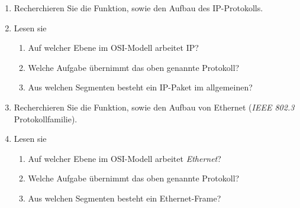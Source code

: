 \documentclass[paper=a4,fontsize=11pt]{scrartcl}%
\numberwithin{equation}{section}
\begin{document}
\begin{enumerate}
	\item Recherchieren Sie die Funktion, sowie den Aufbau des IP-Protokolls.
	\item Lesen sie \cite[Kap. 4.1]{Kurose2012}
	\begin{enumerate}
		\item Auf welcher Ebene im OSI-Modell arbeitet IP?
		\item Welche Aufgabe übernimmt das oben genannte Protokoll?
		\item Aus welchen Segmenten besteht ein IP-Paket im allgemeinen?
	\end{enumerate}
	\item Recherchieren Sie die Funktion, sowie den Aufbau von Ethernet (\emph{IEEE 802.3} Protokollfamilie).
	\item Lesen sie \cite[Kap. 5ff]{Kurose2012}
	\begin{enumerate}
		\item Auf welcher Ebene im OSI-Modell arbeitet \emph{Ethernet}?
		\item Welche Aufgabe übernimmt das oben genannte Protokoll?
		\item Aus welchen Segmenten besteht ein Ethernet-Frame?
	\end{enumerate}
\end{enumerate}
\end{document}
